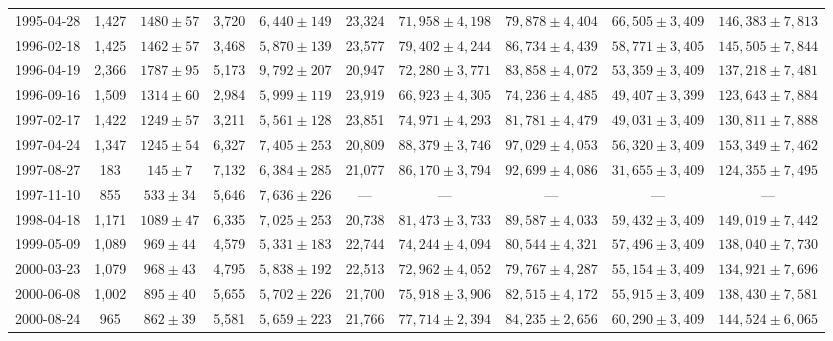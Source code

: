 \begin{landscape}
\begin{longtable}{cccccccccc}
{1995-04-28} & 1,427 & {$1480  \pm  57$} & 3,720 & {$6,440 \pm 149$} & 23,324 & {$71,958 \pm 4,198$} & {$79,878 \pm 4,404$} & {$66,505 \pm 3,409$} & {$146,383 \pm 7,813$} \\
{1996-02-18} & 1,425 & {$1462  \pm  57$} & 3,468 & {$5,870 \pm 139$} & 23,577 & {$79,402 \pm 4,244$} & {$86,734 \pm 4,439$} & {$58,771 \pm 3,405$} & {$145,505 \pm 7,844$} \\
{1996-04-19} & 2,366 & {$1787  \pm  95$} & 5,173 & {$9,792 \pm 207$} & 20,947 & {$72,280 \pm 3,771$} & {$83,858 \pm 4,072$} & {$53,359 \pm 3,409$} & {$137,218 \pm 7,481$} \\
{1996-09-16} & 1,509 & {$1314  \pm  60$} & 2,984 & {$5,999 \pm 119$} & 23,919 & {$66,923 \pm 4,305$} & {$74,236 \pm 4,485$} & {$49,407 \pm 3,399$} & {$123,643 \pm 7,884$} \\
{1997-02-17} & 1,422 & {$1249  \pm  57$} & 3,211 & {$5,561 \pm 128$} & 23,851 & {$74,971 \pm 4,293$} & {$81,781 \pm 4,479$} & {$49,031 \pm 3,409$} & {$130,811 \pm 7,888$} \\
{1997-04-24} & 1,347 & {$1245  \pm  54$} & 6,327 & {$7,405 \pm 253$} & 20,809 & {$88,379 \pm 3,746$} & {$97,029 \pm 4,053$} & {$56,320 \pm 3,409$} & {$153,349 \pm 7,462$} \\
{1997-08-27} & 183 & {$145  \pm  7$} & 7,132 & {$6,384 \pm 285$} & 21,077 & {$86,170 \pm 3,794$} & {$92,699 \pm 4,086$} & {$31,655 \pm 3,409$} & {$124,355 \pm 7,495$} \\
{1997-11-10} & 855 & {$533  \pm  34$} & 5,646 & {$7,636 \pm 226$} & --- & --- & --- & --- & --- \\
{1998-04-18} & 1,171 & {$1089  \pm  47$} & 6,335 & {$7,025 \pm 253$} & 20,738 & {$81,473 \pm 3,733$} & {$89,587 \pm 4,033$} & {$59,432 \pm 3,409$} & {$149,019 \pm 7,442$} \\
{1999-05-09} & 1,089 & {$969  \pm  44$} & 4,579 & {$5,331 \pm 183$} & 22,744 & {$74,244 \pm 4,094$} & {$80,544 \pm 4,321$} & {$57,496 \pm 3,409$} & {$138,040 \pm 7,730$} \\
{2000-03-23} & 1,079 & {$968  \pm  43$} & 4,795 & {$5,838 \pm 192$} & 22,513 & {$72,962 \pm 4,052$} & {$79,767 \pm 4,287$} & {$55,154 \pm 3,409$} & {$134,921 \pm 7,696$} \\
{2000-06-08} & 1,002 & {$895  \pm  40$} & 5,655 & {$5,702 \pm 226$} & 21,700 & {$75,918 \pm 3,906$} & {$82,515 \pm 4,172$} & {$55,915 \pm 3,409$} & {$138,430 \pm 7,581$} \\
{2000-08-24} & 965 & {$862  \pm  39$} & 5,581 & {$5,659 \pm 223$} & 21,766 & {$77,714 \pm 2,394$} & {$84,235 \pm 2,656$} & {$60,290 \pm 3,409$} & {$144,524 \pm 6,065$} \\

\end{longtable}
\end{landscape}
